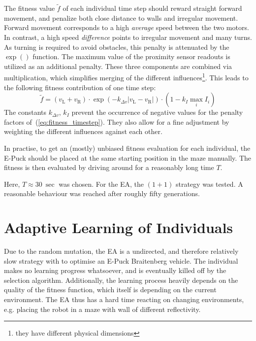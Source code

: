\documentclass[a4paper]{jacow}
\begin{document}
The fitness value $\tilde{f}$ of each individual time step should reward straight forward movement, and penalize both close distance to walls and irregular movement. Forward movement corresponds to a high \emph{average} speed between the two motors. In contrast, a high speed \emph{difference} points to irregular movement and many turns. As turning is required to avoid obstacles, this penalty is attenuated by the $\exp()$ function. The maximum value of the proximity sensor readouts is utilized as an additional penalty. These three components are combined via multiplication, which simplifies merging of the different influences\footnote{they have different physical dimensions}. This leads to the following fitness contribution of one time step:
\begin{equation}
	\tilde{f} = \left( v_\mathrm{L} + v_\mathrm{R} \right) \cdot \exp\left( - k_{\Delta v}|v_\mathrm{L}-v_\mathrm{R}| \right) \cdot \left(1- k_{I} \max\limits_i I_i\right)
	\label{eq:fitness_timestep} 
\end{equation}
The constants $k_{\Delta v}$, $k_I$ prevent the occurrence of negative values for the penalty factors of~(\ref{eq:fitness_timestep}). They also allow for a fine adjustment by weighting the different influences against each other.

In practise, to get an (mostly) unbiased fitness evaluation for each individual, the E-Puck should be placed at the same starting position in the maze manually. The fitness is then evaluated by driving around for a reasonably long time $T$. 

Here, $T\approx\SI{30}{\sec}$ was chosen. For the EA, the $(1+1)$ strategy was tested. A reasonable behaviour was reached after roughly fifty generations.


\section{Adaptive Learning of Individuals}

Due to the random mutation, the EA is a undirected, and therefore relatively slow strategy with to optimise an E-Puck Braitenberg vehicle. The individual makes no learning progress whatsoever, and is eventually killed off by the selection algorithm. Additionally, the learning process heavily depends on the quality of the fitness function, which itself is depending on the current environment. The EA thus has a hard time reacting on changing environments, e.g. placing the robot in a maze with wall of different reflectivity.
\end{document}

